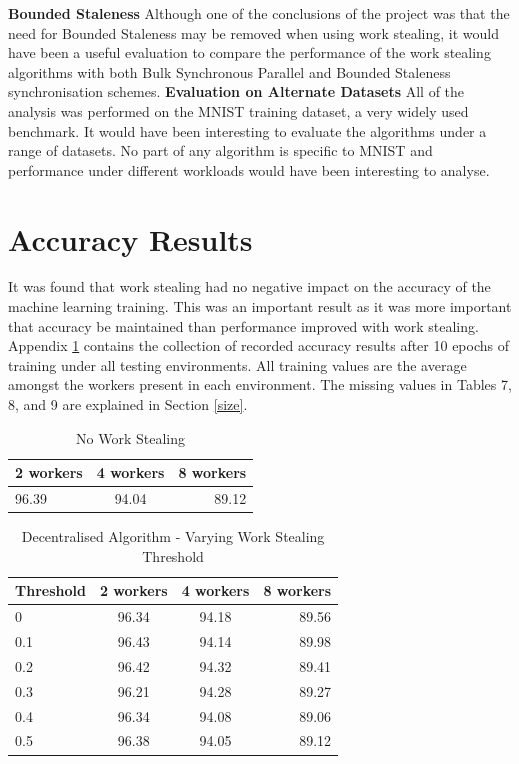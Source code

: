 \documentclass[12pt]{article}
\begin{document}
\textbf{Bounded Staleness}		Although one of the conclusions of the project was that the need for Bounded Staleness may be removed when using work stealing, it would have been a useful evaluation to compare the performance of the work stealing algorithms with both Bulk Synchronous Parallel and Bounded Staleness synchronisation schemes.	
\newline
\newline
\textbf{Evaluation on Alternate Datasets}		All of the analysis was performed on the MNIST training dataset, a very widely used benchmark. It would have been interesting to evaluate the algorithms under a range of datasets. No part of any algorithm is specific to MNIST and performance under different workloads would have been interesting to analyse.

\newpage




\newpage

\appendix
\section{Accuracy Results} \label{accuracyResults}

It was found that work stealing had no negative impact on the accuracy of the machine learning training. This was an important result as it was more important that accuracy be maintained than performance improved with work stealing. Appendix \ref{accuracyResults} contains the collection of recorded accuracy results after 10 epochs of training under all testing environments. All training values are the average amongst the workers present in each environment. The missing values in Tables 7, 8, and 9 are explained in Section \ref{size}.

\begin{table}[htb]
\centering
\caption{No Work Stealing}
\begin{tabular}{l | c | r}
2 workers & 4 workers & 8 workers \\ \hline
96.39     & 94.04     & 89.12
\end{tabular}
\end{table}

\begin{table}[htb]
\centering
\caption{Decentralised Algorithm - Varying Work Stealing Threshold}
\begin{tabular}{l | c | c | r}
Threshold & 2 workers & 4 workers & 8 workers \\ \hline
0                 & 96.34     & 94.18     & 89.56     \\ \hline
0.1               & 96.43     & 94.14     & 89.98     \\ \hline
0.2               & 96.42     & 94.32     & 89.41     \\ \hline
0.3               & 96.21     & 94.28     & 89.27     \\ \hline
0.4               & 96.34     & 94.08     & 89.06     \\ \hline
0.5               & 96.38     & 94.05     & 89.12
\end{tabular}
\end{table}
\end{document}
